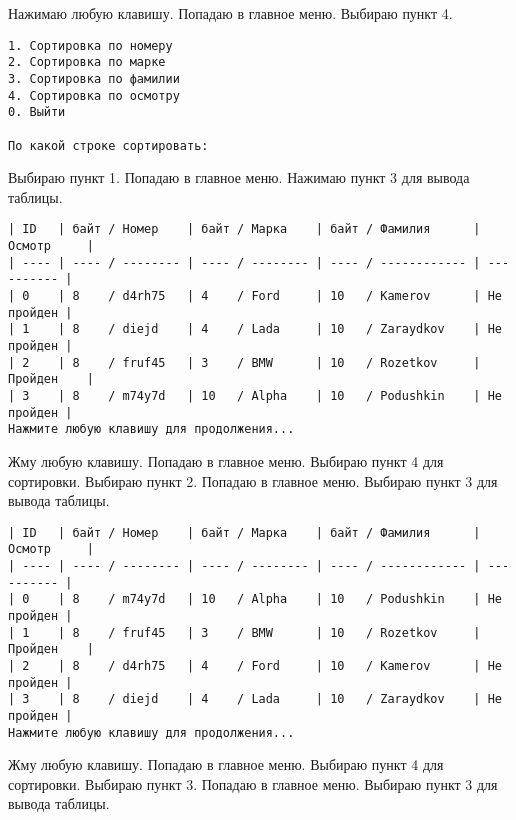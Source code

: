 Нажимаю любую клавишу. Попадаю в главное меню. Выбираю пункт 4.

\begin{tcolorbox}
\begin{verbatim}
1. Сортировка по номеру
2. Сортировка по марке  
3. Сортировка по фамилии
4. Сортировка по осмотру
0. Выйти

По какой строке сортировать: 
\end{verbatim}
\end{tcolorbox}

Выбираю пункт 1. Попадаю в главное меню. Нажимаю пункт 3 для вывода таблицы.

\begin{tcolorbox}
\begin{verbatim}
| ID   | байт / Номер    | байт / Марка    | байт / Фамилия      | Осмотр     |
| ---- | ---- / -------- | ---- / -------- | ---- / ------------ | ---------- |
| 0    | 8    / d4rh75   | 4    / Ford     | 10   / Kamerov      | Не пройден |
| 1    | 8    / diejd    | 4    / Lada     | 10   / Zaraydkov    | Не пройден |
| 2    | 8    / fruf45   | 3    / BMW      | 10   / Rozetkov     | Пройден    |
| 3    | 8    / m74y7d   | 10   / Alpha    | 10   / Podushkin    | Не пройден |
Нажмите любую клавишу для продолжения...
\end{verbatim}
\end{tcolorbox}

Жму любую клавишу. Попадаю в главное меню. Выбираю пункт 4 для сортировки. Выбираю пункт 2. Попадаю в главное меню. Выбираю пункт 3 для вывода таблицы.

\begin{tcolorbox}
\begin{verbatim}
| ID   | байт / Номер    | байт / Марка    | байт / Фамилия      | Осмотр     |
| ---- | ---- / -------- | ---- / -------- | ---- / ------------ | ---------- |
| 0    | 8    / m74y7d   | 10   / Alpha    | 10   / Podushkin    | Не пройден |
| 1    | 8    / fruf45   | 3    / BMW      | 10   / Rozetkov     | Пройден    |
| 2    | 8    / d4rh75   | 4    / Ford     | 10   / Kamerov      | Не пройден |
| 3    | 8    / diejd    | 4    / Lada     | 10   / Zaraydkov    | Не пройден |
Нажмите любую клавишу для продолжения...
\end{verbatim}
\end{tcolorbox}

Жму любую клавишу. Попадаю в главное меню. Выбираю пункт 4 для сортировки. Выбираю пункт 3. Попадаю в главное меню. Выбираю пункт 3 для вывода таблицы.

